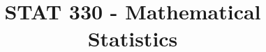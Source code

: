 



\title{STAT 330 - Mathematical Statistics}



\maketitle
\tableofcontents
\newpage






















